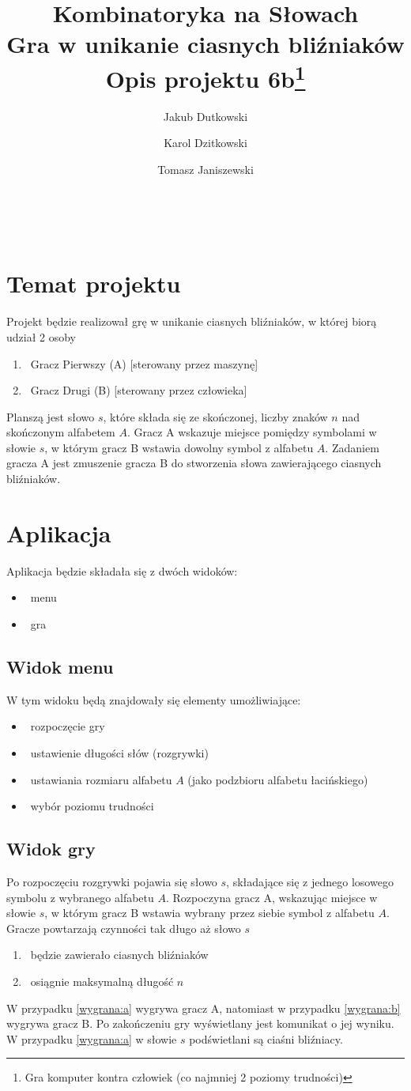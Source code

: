 \documentclass[11pt,a4paper]{article}
\author{Jakub Dutkowski}
\author{Karol Dzitkowski}
\author{Tomasz Janiszewski}
\affil{Wydział Matematyki i Nauk Informacyjnych, Politechnika Warszawska}
\title{
	Kombinatoryka na Słowach\\
	Gra w unikanie ciasnych bliźniaków\\
	Opis projektu
	6b\footnote{Gra komputer kontra człowiek (co najmniej 2 poziomy trudności)}
 }
\begin{document}
\maketitle\
\newpage\


\section{Temat projektu}
Projekt będzie realizował grę w unikanie ciasnych bliźniaków,
w której biorą udział 2 osoby 
\begin{enumerate}
	\item\ Gracz Pierwszy (A) [sterowany przez maszynę]
	\item\ Gracz Drugi (B) [sterowany przez człowieka]
\end{enumerate}
Planszą jest słowo $s$, które składa się ze skończonej,
liczby znaków $n$ nad skończonym alfabetem $A$.
Gracz A wskazuje miejsce pomiędzy symbolami w słowie $s$, w którym gracz B
wstawia dowolny symbol z alfabetu $A$.
Zadaniem gracza A jest zmuszenie gracza B do stworzenia 
słowa zawierającego ciasnych bliźniaków.

\section{Aplikacja}
Aplikacja będzie składała się z dwóch widoków:
\begin{itemize}
 \item\ menu
 \item\ gra
\end{itemize}

\subsection{Widok menu}
W tym widoku będą znajdowały się elementy umożliwiające:

\begin{itemize}
	\item\ rozpoczęcie gry
	\item\ ustawienie długości słów (rozgrywki)
	\item\ ustawiania rozmiaru alfabetu $A$ (jako podzbioru alfabetu łacińskiego)
	\item\ wybór poziomu trudności
\end{itemize}

\subsection{Widok gry}
Po rozpoczęciu rozgrywki pojawia się słowo $s$,
składające się z jednego losowego
symbolu z wybranego alfabetu $A$.
Rozpoczyna gracz A, wskazując miejsce w słowie $s$,
w którym gracz B wstawia wybrany przez
siebie symbol z alfabetu $A$.
Gracze powtarzają czynności tak długo aż słowo $s$
\begin{enumerate}
	\item\ będzie zawierało ciasnych bliźniaków \label{wygrana:a}
	\item\ osiągnie maksymalną długość $n$ \label{wygrana:b}
\end{enumerate}

W przypadku \ref{wygrana:a} wygrywa gracz A, natomiast
w przypadku \ref{wygrana:b} wygrywa gracz B.
Po zakończeniu gry wyświetlany jest komunikat o jej wyniku.
W przypadku \ref{wygrana:a} w słowie $s$ podświetlani są
ciaśni bliźniacy.
\end{document}
